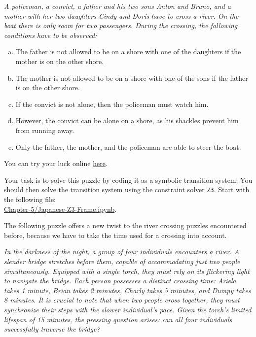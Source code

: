 \begin{minipage}{0.95\linewidth}
{\sl
  A policeman, a convict, a father and his two sons Anton and Bruno, and a mother with her two daughters Cindy and Doris have to cross a river. On the boat there is only room for two passengers.
During the crossing, the following conditions have to be observed:
\begin{enumerate}[(a)]
\item The father is not allowed to be on a shore with one of the daughters if the mother is on the other shore.
\item The mother is not allowed to be on a shore with one of the sons if the father is on the other shore.
\item If the convict is not alone, then the policeman must watch him.
\item However, the convict can be alone on a shore, as his shackles prevent him from running away.
\item Only the father, the mother, and the policeman are able to steer the boat.
\end{enumerate}}
\end{minipage}
\vspace*{0.2cm}

\noindent
You can try your luck online \href{https://flashmuseum.org/iq-%E9%81%8E%E6%B2%B3%E9%81%8A%E6%88%B2/}{here}.

\noindent
Your task is to solve this puzzle by coding it as a symbolic transition system.  You should then solve the
transition system using the constraint solver \texttt{Z3}.
Start with the following file:
\\[0.2cm]
\hspace*{1.3cm}
\href{https://github.com/karlstroetmann/Logic/blob/master/TypeScript/Chapter-5/Japanese-Z3-Frame.ipynb}{Chapter-5/Japanese-Z3-Frame.ipynb}.
\eox

\exerciseEng
The following puzzle offers a new twist to the river crossing puzzles encountered before, because we have to
take the time used for a crossing into account.

\begin{minipage}{0.95\linewidth}
  {\sl
    In the darkness of the night, a group of four individuals encounters a river. A slender bridge stretches
    before them, capable of accommodating just two people simultaneously. Equipped with a single torch, they
    must rely on its flickering light to navigate the bridge. Each person possesses a distinct crossing time:
    Ariela takes 1 minute, Brian takes 2 minutes, Charly takes 5 minutes, and Dumpy takes 8 minutes. It is
    crucial to note that when two people cross together, they must synchronize their steps with the slower
    individual's pace. Given the torch's limited lifespan of 15 minutes, the pressing question arises: can all
    four individuals successfully traverse the bridge? 
  }
\end{minipage}

